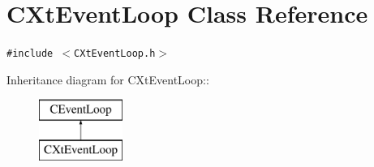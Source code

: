 \section{CXt\-Event\-Loop  Class Reference}
\label{classCXtEventLoop}
{\tt \#include $<$CXt\-Event\-Loop.h$>$}

Inheritance diagram for CXt\-Event\-Loop::\begin{figure}[H]
\begin{center}
\leavevmode
\includegraphics[height=2cm]{classCXtEventLoop}
\end{center}
\end{figure}
